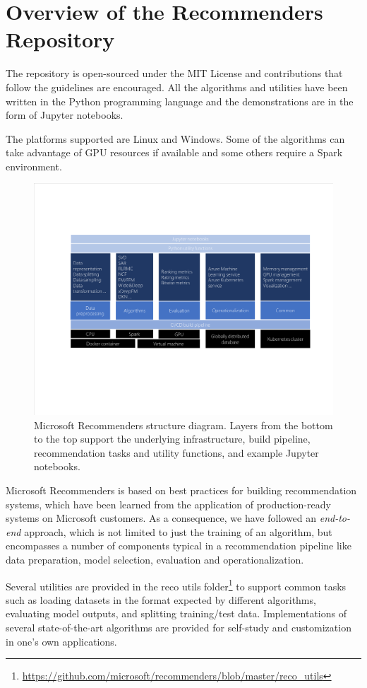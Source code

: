 \section{Overview of the Recommenders Repository}

The repository is open-sourced under the MIT License and contributions that follow the guidelines are encouraged.  
All the algorithms and utilities have been written in the Python programming language and the demonstrations are 
in the form of Jupyter notebooks.

The platforms supported are Linux and Windows. Some of the algorithms can take advantage of GPU resources if available 
and some others require a Spark environment.

\begin{figure}
  \centering
  \includegraphics[width=\textwidth,keepaspectratio]{platform_diagram_crop.pdf}
  \caption{Microsoft Recommenders structure diagram. Layers from the bottom to the top support the underlying 
  infrastructure, build pipeline, recommendation tasks and utility functions, and example Jupyter notebooks.}
\end{figure}

Microsoft Recommenders is based on best practices for building recommendation systems, which have been learned from the 
application of production-ready systems on Microsoft customers. As a consequence, we have followed an {\em end-to-end} approach, which 
is not limited to just the training of an algorithm, but encompasses a number of components typical in a 
recommendation pipeline like data preparation, model selection, evaluation and operationalization.

Several utilities are provided in the 
reco utils folder\footnote{\url{https://github.com/microsoft/recommenders/blob/master/reco_utils}} 
to support common tasks such as loading datasets in the format expected by 
different algorithms, evaluating model outputs, and splitting training/test data. 
Implementations of several state-of-the-art algorithms are provided for self-study and 
customization in one's own applications.

